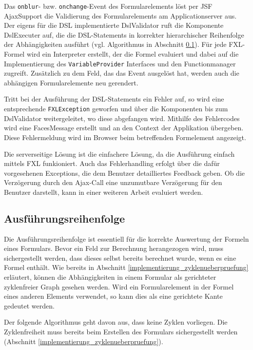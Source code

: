 Das \texttt{onblur}- bzw. \texttt{onchange}-Event des Formularelements löst per JSF Ajax\-Support die Validierung des Formularelements am Applicationserver aus. Der eigens für die DSL implementierte DslValidator ruft die Komponente DslExecuter auf, die die DSL-Statements in korrekter hierarchischer Reihenfolge der Abhängigkeiten ausführt (vgl. Algorithmus in Abschnitt \ref{implementierung_integration_reihenfolge}). Für jede FXL-Formel wird ein Interpreter erstellt, der die Formel evaluiert und dabei auf die Implementierung des \texttt{VariableProvider} Interfaces und den Functionmanager zugreift. Zu\-sätz\-lich zu dem Feld, das das Event ausgelöst hat, werden auch die abhängigen Formularelemente neu gerendert.

Tritt bei der Aus\-führ\-ung der DSL-Statements ein Fehler auf, so wird eine ent\-sprech\-ende \texttt{FXLException} geworfen und über die Komponenten bis zum DslValidator weitergeleitet, wo diese abgefangen wird. Mithilfe des Fehlercodes wird eine FacesMessage erstellt und an den Context der Applikation übergeben. Diese Fehlermeldung wird im Browser beim betreffenden Formelement angezeigt.

Die serverseitige Lösung ist die einfachere Lösung, da die Aus\-führ\-ung einfach mittels FXL funkioniert. Auch das Fehlerhandling erfolgt über die dafür vorgesehenen Exceptions, die dem Benutzer detailliertes Feedback geben. Ob die Verzögerung durch den Ajax-Call eine unzumutbare Verzögerung für den Benutzer darstellt, kann in einer weiteren Arbeit evaluiert werden. 


\subsection{Aus\-führ\-ungsreihenfolge}
\label{implementierung_integration_reihenfolge}

Die Aus\-führ\-ungsreihenfolge ist essentiell für die korrekte Auswertung der Formeln eines Formulars. Bevor ein Feld zur Berechnung herangezogen wird, muss sichergestellt werden, dass dieses selbst bereits berechnet wurde, wenn es eine Formel enthält. Wie bereits in Abschnitt \ref{implementierung_zyklenueberpruefung} erläutert, können die Abhängigkeiten in einem Formular als gerichteter zyklenfreier Graph gesehen werden. Wird ein Formularelement in der Formel eines anderen Elements verwendet, so kann dies als eine gerichtete Kante gedeutet werden.

Der folgende Algorithmus geht davon aus, dass keine Zyklen vorliegen. Die Zyklenfreiheit muss bereits beim Erstellen des Formulars sichergestellt werden (Abschnitt \ref{implementierung_zyklenueberpruefung}).

